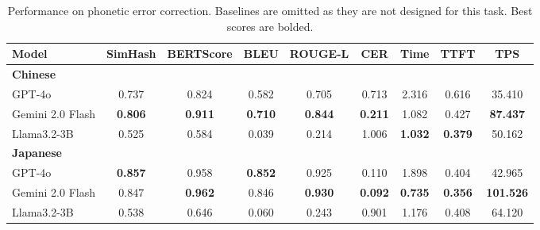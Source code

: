 \documentclass[10pt, a4paper]{article}
\begin{document}
\begin{table}[h]
\centering
\small
\begin{tabular}{lcccccccc}
\toprule
\textbf{Model} & \textbf{SimHash} & \textbf{BERTScore} & \textbf{BLEU} & \textbf{ROUGE-L} & \textbf{CER} & \textbf{Time} & \textbf{TTFT} & \textbf{TPS} \\
\midrule
\multicolumn{9}{l}{\textbf{Chinese}} \\
GPT-4o & 0.737 & 0.824 & 0.582 & 0.705 & 0.713 & 2.316 & 0.616 & 35.410 \\
Gemini 2.0 Flash & \textbf{0.806} & \textbf{0.911} & \textbf{0.710} & \textbf{0.844} & \textbf{0.211} & 1.082 & {0.427} & \textbf{87.437} \\
Llama3.2-3B & 0.525 & 0.584 & 0.039 & 0.214 & 1.006 & \textbf{1.032} & \textbf{0.379} & {50.162} \\
\midrule
\multicolumn{9}{l}{\textbf{Japanese}} \\
GPT-4o & \textbf{0.857} & 0.958 & \textbf{0.852} & 0.925 & 0.110 & 1.898 & 0.404 & 42.965 \\
Gemini 2.0 Flash & 0.847 & \textbf{0.962} & 0.846 & \textbf{0.930} & \textbf{0.092} & \textbf{0.735} & \textbf{0.356} & \textbf{101.526} \\
Llama3.2-3B & 0.538 & 0.646 & 0.060 & 0.243 & 0.901 & 1.176 & 0.408 & 64.120 \\
\bottomrule
\end{tabular}
\caption{Performance on phonetic error correction. Baselines are omitted as they are not designed for this task. Best scores are bolded.}
\label{tab:phonetic_correction_results}
\end{table}

\end{document}
